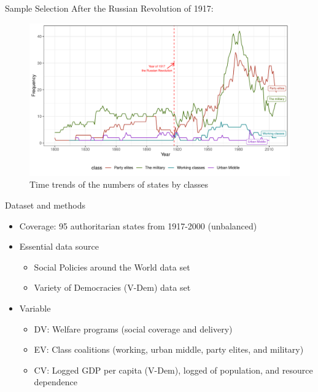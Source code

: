 \documentclass{Bredelebeamer}
\begin{document}
\begin{frame}{Sample Selection}
After the Russian Revolution of 1917: \centering \pause
\begin{figure}[!htbt]
	\centering
	\includegraphics[width=0.9\linewidth]{"../3. Datasets_Codebooks/Figures/Plot3"}
	\caption{Time trends of the numbers of states by classes}
	\label{fig:plot2}
\end{figure}
\end{frame}

\begin{frame}{Dataset and methods}
\begin{itemize}
	\item Coverage: 95 authoritarian states from 1917-2000 (unbalanced)
	\item Essential data source
	\begin{itemize}
		\item Social Policies around the World data set
		\item Variety of Democracies (V-Dem) data set
	\end{itemize}
	\item Variable
	\begin{itemize}
		\item DV: Welfare programs (social coverage and delivery)
		\item EV: Class coalitions (working, urban middle, party elites, and military)
		\item CV: Logged GDP per capita (V-Dem), logged of population, and resource dependence \citep{Miller2015}
	\end{itemize}
\end{itemize}
\end{frame}
\end{document}
